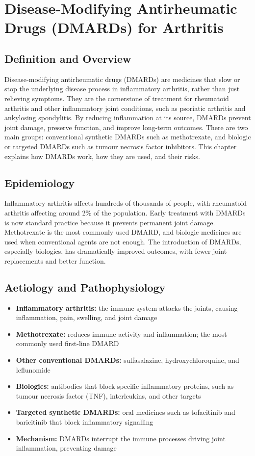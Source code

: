 \chapter{Disease-Modifying Antirheumatic Drugs (DMARDs) for Arthritis}

\section*{Definition and Overview}
Disease-modifying antirheumatic drugs (DMARDs) are medicines that slow or stop the underlying disease process in inflammatory arthritis, rather than just relieving symptoms. They are the cornerstone of treatment for rheumatoid arthritis and other inflammatory joint conditions, such as psoriatic arthritis and ankylosing spondylitis. By reducing inflammation at its source, DMARDs prevent joint damage, preserve function, and improve long-term outcomes. There are two main groups: conventional synthetic DMARDs such as methotrexate, and biologic or targeted DMARDs such as tumour necrosis factor inhibitors. This chapter explains how DMARDs work, how they are used, and their risks.

\section*{Epidemiology}
Inflammatory arthritis affects hundreds of thousands of people, with rheumatoid arthritis affecting around 2\% of the population. Early treatment with DMARDs is now standard practice because it prevents permanent joint damage. Methotrexate is the most commonly used DMARD, and biologic medicines are used when conventional agents are not enough. The introduction of DMARDs, especially biologics, has dramatically improved outcomes, with fewer joint replacements and better function.

\section*{Aetiology and Pathophysiology}
\begin{itemize}
    \item \textbf{Inflammatory arthritis:} the immune system attacks the joints, causing inflammation, pain, swelling, and joint damage
    \item \textbf{Methotrexate:} reduces immune activity and inflammation; the most commonly used first-line DMARD
    \item \textbf{Other conventional DMARDs:} sulfasalazine, hydroxychloroquine, and leflunomide
    \item \textbf{Biologics:} antibodies that block specific inflammatory proteins, such as tumour necrosis factor (TNF), interleukins, and other targets
    \item \textbf{Targeted synthetic DMARDs:} oral medicines such as tofacitinib and baricitinib that block inflammatory signalling
    \item \textbf{Mechanism:} DMARDs interrupt the immune processes driving joint inflammation, preventing damage
\end{itemize}

